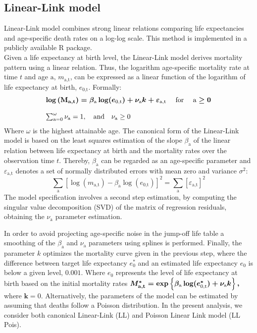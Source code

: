 \documentclass[a4,11pt]{article}
\begin{document}
\subsection{Linear-Link model}
Linear-Link model combines strong linear relations comparing life expectancies and age-specific death rates on a log-log scale. This method is implemented in a publicly available R package.\\
Given a life expectancy at birth level, the Linear-Link model derives mortality pattern using a linear relation. Thus, the logarithm age-specific mortality rate at time $t$ and age $\text{a}$, $m_\text{a,t}$, can be expressed as a linear function of the logarithm of life expectancy at birth, $e_{\text{0,t}}$. Formally:
	\begin{equation}
	\begin{array}{l}
	\log{\left(\mathbf{M}_{\mathbf{a,t}}\right)}=\boldmath{\beta}_{\text{a}} \log(\boldmath{e}_{\text{0,t}})+\nu_{\text{a}} k+\varepsilon_{\text{a,t}} \quad \text { for } \quad \text{a} \geq 0 \\
	\\ \sum_{\text{a}=0}^{\omega} \nu_{\text{\text{a}}}=1, \quad \text {and} \quad \nu_{\text{a}} \geq 0
	\end{array}
	\end{equation}
Where $\omega$ is the highest attainable age. The canonical form of the Linear-Link model is based on the least squares estimation of the slope $\beta_\text{a}$ of the linear relation between life expectancy at birth and the mortality rates over the observation time $t$. Thereby, $\beta_\text{a}$ can be regarded as an age-specific parameter and $\varepsilon_{\text{a,t}}$ denotes a set of normally distributed errors with mean zero and variance $\sigma^{2}$:
	\begin{equation}
	\sum_{\text{a}}\left[\log(m_{\text{a,t}})-\beta_{\text{a}} \log(e_{\text{0,t}})\right]^{2}=\sum_{\text{a}}\left[\varepsilon_{{\text{a,t}}}\right]^{2}
	\end{equation}
The model specification involves a second step estimation, by computing the singular value decomposition (SVD) of the matrix of regression residuals, obtaining the $\nu_{\text{a}}$ parameter estimation.

In order to avoid projecting age-specific noise in the jump-off life table a smoothing of the $\beta_{\text{a}}$ and $\nu_{\text{a}}$ parameters using splines is performed.
Finally, the parameter $k$ optimizes the mortality curve given in the previous step, where the difference between target life expectancy $e_{0}^{*}$ and an estimated life expectancy $e_{0}$ is below a given level, $0.001$. Where $e_{0}$ represents the level of life expectancy at birth based on the initial mortality rates $\boldmath{M}_{\mathbf{a,t}}^{*}=\exp \left\{\beta_{\text{a}}\log(e_{\text{0,t}}^{*})+\nu_{\text{a}} k\right\},$ where $\boldsymbol{k}=0$. 
Alternatively, the parameters of the model can be estimated by assuming that deaths follow a Poisson distribution. In the present analysis, we consider both canonical Linear-Link (LL) and Poisson Linear Link model (LL Pois).
\end{document}
